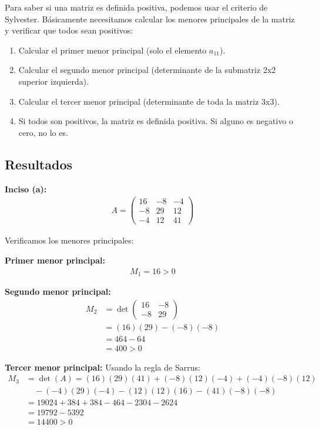 \documentclass{article}
\begin{document}
Para saber si una matriz es definida positiva, podemos usar el criterio de Sylvester. Básicamente necesitamos calcular los menores principales de la matriz y verificar que todos sean positivos:
\begin{enumerate}
    \item Calcular el primer menor principal (solo el elemento $a_{11}$).
    \item Calcular el segundo menor principal (determinante de la submatriz 2x2 superior izquierda).
    \item Calcular el tercer menor principal (determinante de toda la matriz 3x3).
    \item Si todos son positivos, la matriz es definida positiva. Si alguno es negativo o cero, no lo es.
\end{enumerate}

\subsection{Resultados}
\setcounter{equation}{0}

\textbf{Inciso (a):}
\begin{align}
    A=\begin{pmatrix} 16 & -8 & -4\\ -8 & 29 & 12\\ -4 & 12 & 41 \end{pmatrix}
\end{align}

Verificamos los menores principales:

\textbf{Primer menor principal:}
\begin{align}
M_1 = 16 > 0
\end{align}

\textbf{Segundo menor principal:}
\begin{align}
M_2 &= \det\begin{pmatrix} 16 & -8 \\ -8 & 29 \end{pmatrix} \\
&= (16)(29) - (-8)(-8) \\
&= 464 - 64 \\
&= 400 > 0
\end{align}

\textbf{Tercer menor principal:}
Usando la regla de Sarrus:
\begin{align}
M_3 &= \det(A) = (16)(29)(41) + (-8)(12)(-4) + (-4)(-8)(12) \\
&\quad - (-4)(29)(-4) - (12)(12)(16) - (41)(-8)(-8) \\
&= 19024 + 384 + 384 - 464 - 2304 - 2624 \\
&= 19792 - 5392 \\
&= 14400 > 0
\end{align}
\end{document}
